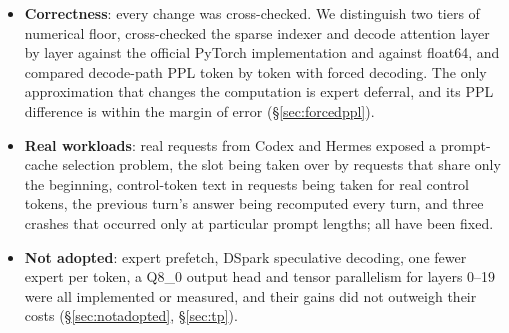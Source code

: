 \documentclass[11pt,a4paper]{article}
\begin{document}
\begin{itemize}
  \item \textbf{Correctness}: every change was cross-checked. We distinguish two tiers of numerical floor, cross-checked the sparse indexer and decode attention layer by layer against the official PyTorch implementation and against float64, and compared decode-path PPL token by token with forced decoding. The only approximation that changes the computation is expert deferral, and its PPL difference is within the margin of error (\S\ref{sec:forcedppl}).
  \item \textbf{Real workloads}: real requests from Codex and Hermes exposed a prompt-cache selection problem, the slot being taken over by requests that share only the beginning, control-token text in requests being taken for real control tokens, the previous turn's answer being recomputed every turn, and three crashes that occurred only at particular prompt lengths; all have been fixed.
  \item \textbf{Not adopted}: expert prefetch, DSpark speculative decoding, one fewer expert per token, a Q8\_0 output head and tensor parallelism for layers 0--19 were all implemented or measured, and their gains did not outweigh their costs (\S\ref{sec:notadopted}, \S\ref{sec:tp}).
\end{itemize}
\end{document}
